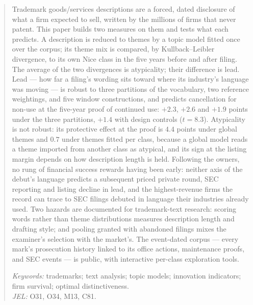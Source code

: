 \begin{abstract}
\noindent Trademark goods/services descriptions are a forced, dated
disclosure of what a firm expected to sell, written by the millions of
firms that never patent. This paper builds two measures on them and tests
what each predicts. A description is reduced to themes by a topic model
fitted once over the corpus; its theme mix is compared, by
Kullback--Leibler divergence, to its own Nice class in the five years
before and after filing. The average of the two divergences is
atypicality; their difference is lead. Lead --- how far a filing's
wording sits toward where its industry's language was moving --- is
robust to three partitions of the vocabulary, two reference weightings,
and five window constructions, and predicts cancellation for non-use at
the five-year proof of continued use: $+2.3$, $+2.6$ and $+1.9$ points
under the three partitions, $+1.4$ with design controls ($t = 8.3$).
Atypicality is not robust: its protective effect at the proof is $4.4$
points under global themes and $0.7$ under themes fitted per class,
because a global model reads a theme imported from another class as
atypical, and its sign at the listing margin depends on how description
length is held. Following the owners, no rung of financial success
rewards having been early: neither axis of the debut's language predicts
a subsequent priced private round, SEC reporting and listing decline in
lead, and the highest-revenue firms the record can trace to SEC filings
debuted in language their industries already used. Two hazards are documented
for trademark-text research: scoring words rather than theme
distributions measures description length and drafting style; and
pooling granted with abandoned filings mixes the examiner's selection
with the market's. The event-dated corpus --- every mark's prosecution
history linked to its office actions, maintenance proofs, and SEC
events --- is public, with interactive per-class exploration tools.

\medskip
\noindent\emph{Keywords:} trademarks; text analysis; topic models;
innovation indicators; firm survival; optimal distinctiveness.\\
\emph{JEL:} O31, O34, M13, C81.
\end{abstract}
